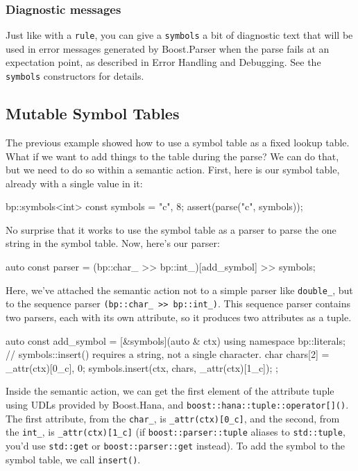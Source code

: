 \subsubsection{Diagnostic messages}

Just like with a \texttt{rule}, you can give a \texttt{symbols} a bit of diagnostic text that will be used in error messages generated by Boost.Parser when the parse fails at an expectation point, as described in Error Handling and Debugging. See the \texttt{symbols} constructors for details.

\subsection{Mutable Symbol Tables}

The previous example showed how to use a symbol table as a fixed lookup table. What if we want to add things to the table during the parse? We can do that, but we need to do so within a semantic action. First, here is our symbol table, already with a single value in it:

\begin{code}
bp::symbols<int> const symbols = {{"c", 8}};
assert(parse("c", symbols));
\end{code}

No surprise that it works to use the symbol table as a parser to parse the one string in the symbol table. Now, here's our parser:

\begin{code}
auto const parser = (bp::char_ >> bp::int_)[add_symbol] >> symbols;
\end{code}

Here, we've attached the semantic action not to a simple parser like \texttt{double\_}, but to the sequence parser \texttt{(bp::char\_ >> bp::int\_)}. This sequence parser contains two parsers, each with its own attribute, so it produces two attributes as a tuple.

\begin{code}
auto const add_symbol = [&symbols](auto & ctx) {
    using namespace bp::literals;
    // symbols::insert() requires a string, not a single character.
    char chars[2] = {_attr(ctx)[0_c], 0};
    symbols.insert(ctx, chars, _attr(ctx)[1_c]);
};
\end{code}

Inside the semantic action, we can get the first element of the attribute tuple using UDLs provided by Boost.Hana, and \texttt{boost::hana::tuple::operator{[}{]}()}. The first attribute, from the \texttt{char\_}, is \texttt{\_attr(ctx){[}0\_c{]}}, and the second, from the \texttt{int\_}, is \texttt{\_attr(ctx){[}1\_c{]}} (if \texttt{boost::parser::tuple} aliases to \texttt{std::tuple}, you'd use \texttt{std::get} or \texttt{boost::parser::get} instead). To add the symbol to the symbol table, we call \texttt{insert()}.

